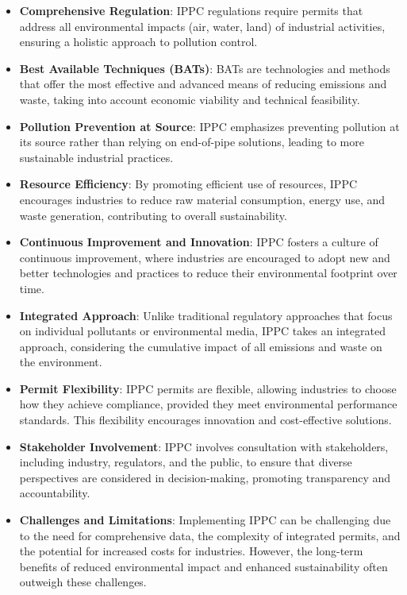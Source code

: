 \documentclass[11pt]{article}
\begin{document}
\begin{itemize}
	\item \textbf{Comprehensive Regulation}: IPPC regulations require permits that address all environmental impacts (air, water, land) of industrial activities, ensuring a holistic approach to pollution control.

	\item \textbf{Best Available Techniques (BATs)}: BATs are technologies and methods that offer the most effective and advanced means of reducing emissions and waste, taking into account economic viability and technical feasibility.

	\item \textbf{Pollution Prevention at Source}: IPPC emphasizes preventing pollution at its source rather than relying on end-of-pipe solutions, leading to more sustainable industrial practices.

	\item \textbf{Resource Efficiency}: By promoting efficient use of resources, IPPC encourages industries to reduce raw material consumption, energy use, and waste generation, contributing to overall sustainability.

	\item \textbf{Continuous Improvement and Innovation}: IPPC fosters a culture of continuous improvement, where industries are encouraged to adopt new and better technologies and practices to reduce their environmental footprint over time.

	\item \textbf{Integrated Approach}: Unlike traditional regulatory approaches that focus on individual pollutants or environmental media, IPPC takes an integrated approach, considering the cumulative impact of all emissions and waste on the environment.

	\item \textbf{Permit Flexibility}: IPPC permits are flexible, allowing industries to choose how they achieve compliance, provided they meet environmental performance standards. This flexibility encourages innovation and cost-effective solutions.

	\item \textbf{Stakeholder Involvement}: IPPC involves consultation with stakeholders, including industry, regulators, and the public, to ensure that diverse perspectives are considered in decision-making, promoting transparency and accountability.

	\item \textbf{Challenges and Limitations}: Implementing IPPC can be challenging due to the need for comprehensive data, the complexity of integrated permits, and the potential for increased costs for industries. However, the long-term benefits of reduced environmental impact and enhanced sustainability often outweigh these challenges.
\end{itemize}
\end{document}
